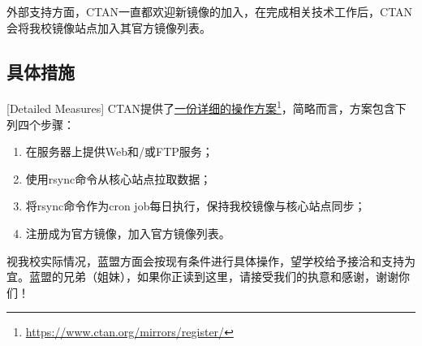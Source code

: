 外部支持方面，CTAN一直都欢迎新镜像的加入，在完成相关技术工作后，CTAN会将我校镜像站点加入其官方镜像列表。

\subsection{具体措施}[Detailed Measures]
CTAN提供了\href{https://www.ctan.org/mirrors/register/}{一份详细的操作方案}\footnote{\url{https://www.ctan.org/mirrors/register/}}，简略而言，方案包含下列四个步骤：
\begin{enumerate}
	\item 在服务器上提供Web和/或FTP服务；
	\item 使用rsync命令从核心站点拉取数据；
	\item 将rsync命令作为cron job每日执行，保持我校镜像与核心站点同步；
	\item 注册成为官方镜像，加入官方镜像列表。
\end{enumerate}

视我校实际情况，蓝盟方面会按现有条件进行具体操作，望学校给予接洽和支持为宜。蓝盟的兄弟（姐妹），如果你正读到这里，请接受我们的执意和感谢，谢谢你们！
